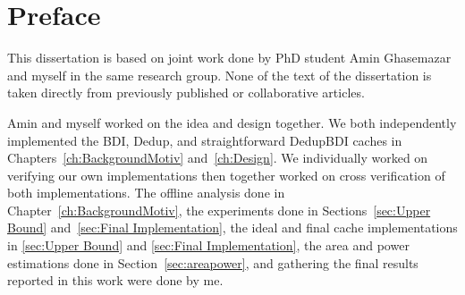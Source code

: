 
\chapter{Preface}

This dissertation is based on joint work done by PhD student Amin Ghasemazar and myself in the same research group. None of the text of the dissertation is taken directly from previously published or collaborative articles.\par
Amin and myself worked on the idea and design together. We both independently implemented the BDI, Dedup, and straightforward DedupBDI caches in Chapters~\ref{ch:BackgroundMotiv} and~\ref{ch:Design}. We individually worked on verifying our own implementations then together worked on cross verification of both implementations.
The offline analysis done in Chapter~\ref{ch:BackgroundMotiv}, the experiments done in Sections~\ref{sec:Upper Bound} and~\ref{sec:Final Implementation}, the ideal and final cache implementations in \ref{sec:Upper Bound} and \ref{sec:Final Implementation}, the area and power estimations done in Section~\ref{sec:areapower}, and gathering the final results reported in this work were done by me.